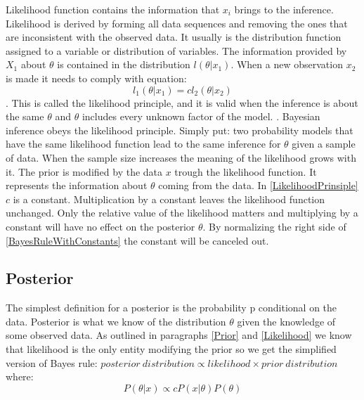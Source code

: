 Likelihood function contains the information that $x_i$ brings to the inference. \cite{Robert2007TheBC} Likelihood is derived by forming all data sequences and removing the ones that are inconsistent with the observed data. It usually is the distribution function assigned to a variable or distribution of variables. \cite{Mcelreath2015StatisticalRA} The information provided by $X_1$ about $\theta$ is contained in the distribution $l(\theta|x_1)$. When a new observation $x_2$ is made it needs to comply with equation:
\begin{equation}\label{LikelihoodPrinsiple}
l_1(\theta|x_1) = cl_2(\theta|x_2)
\end{equation}
\cite{Robert2007TheBC}. This is called the likelihood principle, and it is valid when the inference is about the same $\theta$ and $\theta$ includes every unknown factor of the model. \cite{Robert2007TheBC}. Bayesian inference obeys the likelihood principle. Simply put: two probability models that have the same likelihood function lead to the same inference for $\theta$ given a sample of data.\cite{Gel2014BayesianDA}
When the sample size increases the meaning of the likelihood grows with it. \cite{Mcelreath2015StatisticalRA} The prior is modified by the data $x$ trough the likelihood function. It represents the information about $\theta$ coming from the data. In \ref{LikelihoodPrinsiple} $c$ is a constant. Multiplication by a constant leaves the likelihood function unchanged. Only the relative value of the likelihood matters and multiplying by a constant will have no effect on the posterior $\theta$. By normalizing the right side of \ref{BayesRuleWithConstants} the constant will be canceled out.\cite{Box1973BayesianII}
 
\subsection{Posterior}\label{Posterior}
The simplest definition for a posterior is the probability p conditional on the data.\cite{Mcelreath2015StatisticalRA} Posterior is what we know of the distribution $\theta$ given the knowledge of some observed data.
As outlined in paragraphs \ref{Prior} and \ref{Likelihood} we know that likelihood is the only entity modifying the prior so we get the simplified version of Bayes rule: $posterior\ distribution \propto likelihood \times prior\ distribution$ where: 
\begin{equation}\label{BayesRuleWithConstants}
P(\theta|x) \propto cP(x|\theta)P(\theta)
\end{equation}\cite{Box1973BayesianII}


